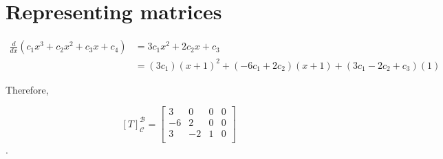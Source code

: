 \section{Representing matrices}
\begin{align*}
    \frac{d}{dx}(c_1x^3 + c_2x^2 + c_3x + c_4) 
    &= 3c_1x^2 + 2c_2x + c_3 \\ 
    &= (3c_1)(x+1)^2 + (-6c_1+2c_2)(x+1) + (3c_1-2c_2+c_3)(1)
\end{align*}

Therefore,

\[
[T]_\mathcal{C}^\mathcal{B} =
\begin{bmatrix}
    3 & 0 & 0 & 0\\
    -6 & 2 & 0 & 0\\
    3 & -2 & 1 & 0\\
\end{bmatrix} 
\].
